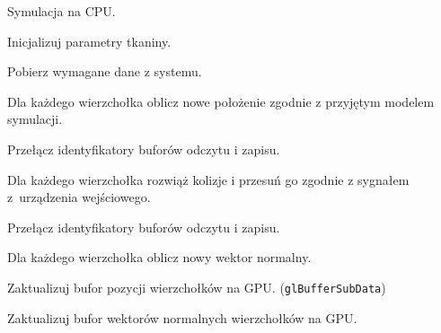 		\newpage
		\begin{algorithm}[H]
			\label{alg_5_2}
			\caption{Symulacja na CPU.}	
			
			Inicjalizuj parametry tkaniny.
			
			{
				Pobierz wymagane dane z systemu.
				
				Dla każdego wierzchołka oblicz nowe położenie zgodnie z przyjętym modelem symulacji.
				
				Przełącz identyfikatory buforów odczytu i zapisu.
				
				Dla każdego wierzchołka rozwiąż kolizje i przesuń go zgodnie z sygnałem z~urządzenia wejściowego.
				
				Przełącz identyfikatory buforów odczytu i zapisu.
				
				Dla każdego wierzchołka oblicz nowy wektor normalny.
				
				Zaktualizuj bufor pozycji wierzchołków na GPU. (\texttt{glBufferSubData})
				
				Zaktualizuj bufor wektorów normalnych wierzchołków na GPU.
			}
			
		\end{algorithm}
		\newpage
